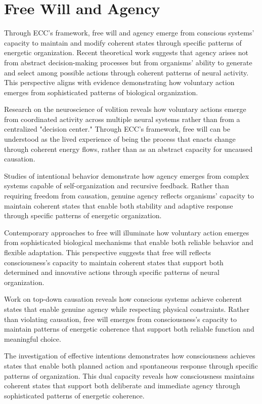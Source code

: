 \section{Free Will and Agency}

Through ECC's framework, free will and agency emerge from conscious systems' capacity to maintain and modify coherent states through specific patterns of energetic organization. Recent theoretical work \cite{Deacon2011} suggests that agency arises not from abstract decision-making processes but from organisms' ability to generate and select among possible actions through coherent patterns of neural activity. This perspective aligns with evidence demonstrating how voluntary action emerges from sophisticated patterns of biological organization.

Research on the neuroscience of volition \cite{Clark2001} reveals how voluntary actions emerge from coordinated activity across multiple neural systems rather than from a centralized "decision center." Through ECC's framework, free will can be understood as the lived experience of being the process that enacts change through coherent energy flows, rather than as an abstract capacity for uncaused causation.

Studies of intentional behavior \cite{Juarrero1999} demonstrate how agency emerges from complex systems capable of self-organization and recursive feedback. Rather than requiring freedom from causation, genuine agency reflects organisms' capacity to maintain coherent states that enable both stability and adaptive response through specific patterns of energetic organization.

Contemporary approaches to free will \cite{Dennett2003} illuminate how voluntary action emerges from sophisticated biological mechanisms that enable both reliable behavior and flexible adaptation. This perspective suggests that free will reflects consciousness's capacity to maintain coherent states that support both determined and innovative actions through specific patterns of neural organization.

Work on top-down causation \cite{Ellis2016} reveals how conscious systems achieve coherent states that enable genuine agency while respecting physical constraints. Rather than violating causation, free will emerges from consciousness's capacity to maintain patterns of energetic coherence that support both reliable function and meaningful choice.

The investigation of effective intentions \cite{Mele2009} demonstrates how consciousness achieves states that enable both planned action and spontaneous response through specific patterns of organization. This dual capacity reveals how consciousness maintains coherent states that support both deliberate and immediate agency through sophisticated patterns of energetic coherence.

